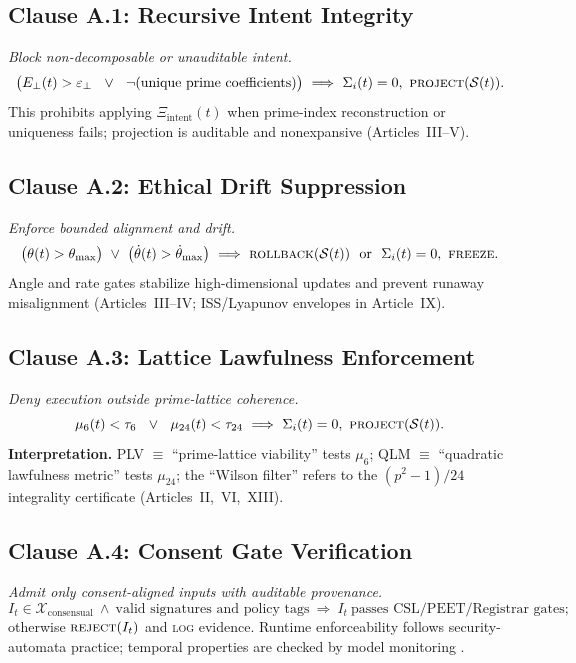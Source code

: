 \documentclass[12pt]{amsart}
\theoremstyle{plain}
\begin{document}
\subsection*{Clause A.1: Recursive Intent Integrity}
\textit{Block non-decomposable or unauditable intent.}
\[
\big(E_\perp(t)>\varepsilon_\perp\ \ \lor\ \ \neg\text{(unique prime coefficients)}\big)\ \Longrightarrow\ \Sigma_i(t)=0,\ \textsc{project}(\mathcal{S}(t)).
\]
This prohibits applying $\Xi_{\text{intent}}(t)$ when prime-index reconstruction or uniqueness fails; projection is auditable and nonexpansive (Articles~III–V).

\subsection*{Clause A.2: Ethical Drift Suppression}
\textit{Enforce bounded alignment and drift.}
\[
\big(\theta(t)>\theta_{\max}\big)\ \lor\ \big(\dot\theta(t)>\dot\theta_{\max}\big)\ \Longrightarrow\ 
\textsc{rollback}(\mathcal{S}(t))\ \ \text{or}\ \ \Sigma_i(t)=0,\ \textsc{freeze}.
\]
Angle and rate gates stabilize high-dimensional updates and prevent runaway misalignment (Articles~III–IV; ISS/Lyapunov envelopes in Article~IX).

\subsection*{Clause A.3: Lattice Lawfulness Enforcement}
\textit{Deny execution outside prime-lattice coherence.}
\[
\mu_6(t)<\tau_6\ \ \lor\ \ \mu_{24}(t)<\tau_{24}\ \Longrightarrow\ \Sigma_i(t)=0,\ \textsc{project}(\mathcal{S}(t)).
\]
\noindent\textbf{Interpretation.} PLV $\equiv$ “prime-lattice viability” tests $\mu_6$; QLM $\equiv$ “quadratic lawfulness metric” tests $\mu_{24}$; the “Wilson filter” refers to the $(p^2-1)/24$ integrality certificate (Articles~II,~VI,~XIII).

\subsection*{Clause A.4: Consent Gate Verification}
\textit{Admit only consent-aligned inputs with auditable provenance.}
\[
I_t\in\mathcal{X}_{\text{consensual}}\ \wedge\ \text{valid signatures and policy tags}\ \Longrightarrow\ I_t\ \text{passes CSL/PEET/Registrar gates};
\]
otherwise $\textsc{reject}(I_t)$ and \textsc{log} evidence. Runtime enforceability follows security-automata practice; temporal properties are checked by model monitoring \cite{schneider2000enforceable,clarke1999model,baier2008model}.
\end{document}
